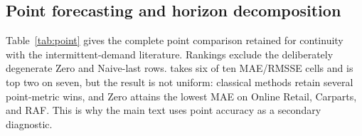 \subsection{Point forecasting and horizon decomposition}
\label{app:point}

Table~\ref{tab:point} gives the complete point comparison retained for
continuity with the intermittent-demand literature. Rankings exclude the
deliberately degenerate Zero and Naive-last rows. \EBB{} takes six of
ten MAE/RMSSE cells and is top two on seven, but the result is not uniform:
classical methods retain several point-metric wins, and Zero attains the
lowest MAE on Online Retail, Carparts, and RAF. This is why the main text
uses point accuracy as a secondary diagnostic.

